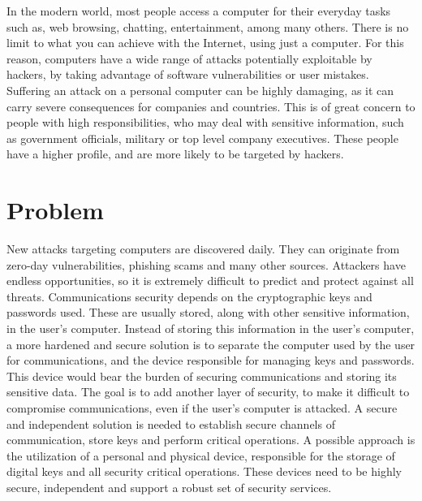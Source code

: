 \cleardoublepage
\label{chap:intro}

In the modern world, most people access a computer for their everyday tasks such as, web browsing, chatting, entertainment, among many others.
There is no limit to what you can achieve with the Internet, using just a computer.
For this reason, computers have a wide range of attacks potentially exploitable by hackers, by taking advantage of software vulnerabilities or user mistakes.
Suffering an attack on a personal computer can be highly damaging, as it can carry severe consequences for companies and countries.
This is of great concern to people with high responsibilities, who may deal with sensitive information, such as government officials, military or top level company executives.
These people have a higher profile, and are more likely to be targeted by hackers.

\section{Problem}\label{chap:intro:problem}

New attacks targeting computers are discovered daily.
They can originate from zero-day vulnerabilities, phishing scams and many other sources. Attackers have endless opportunities, so it is extremely difficult to predict and protect against all threats.
Communications security depends on the cryptographic keys and passwords used. These are usually stored, along with other sensitive information, in the user's computer.
Instead of storing this information in the user's computer, a more hardened and secure solution is to separate the computer used by the user for communications, and the device responsible for managing keys and passwords. This device would bear the burden of securing communications and storing its sensitive data.
The goal is to add another layer of security, to make it difficult to compromise communications, even if the user's computer is attacked.
A secure and independent solution is needed to establish secure channels of communication, store keys and perform critical operations. A possible approach is the utilization of a personal and physical device, responsible for the storage of digital keys and all security critical operations. These devices need to be highly secure, independent and support a robust set of security services. %


